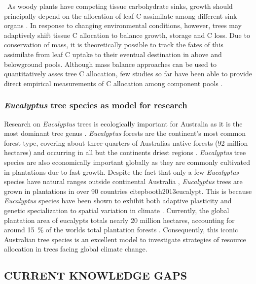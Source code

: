 \documentclass[a4paper]{article}
\begin{document}
\
As woody plants have competing tissue carbohydrate sinks, growth should principally depend on the allocation of leaf C assimilate among different sink organs \citep{kozlowski1992carbohydrate, lacointe2000carbon}. In response to changing environmental conditions, however, trees may adaptively shift tissue C allocation to balance growth, storage and C loss. Due to conservation of mass, it is theoretically possible to track the fates of this assimilate from leaf C uptake to their eventual destination in above and belowground pools. Although mass balance approaches can be used to quantitatively asses tree C allocation, few studies so far have been able to provide direct empirical measurements of C allocation among component pools \citep{klein2015}.

\subsubsection*{\textit{Eucalyptus} tree species as model for research}
Research on \textit{Eucalyptus} trees is ecologically important for Australia as it is the most dominant tree genus \citep{boland2006forest}. \textit{Eucalyptus} forests are the continent’s most common forest type, covering about three-quarters of Australia\textquotesingle s native forests (92 million hectares) and occurring in all but the continent\textquotesingle s driest regions \citep{ASOFR2013}. \textit{Eucalyptus} tree species are also economically important globally as they are commonly cultivated in plantations due to fast growth. Despite the fact that only a few \textit{Eucalyptus} species have natural ranges outside continental Australia \citep{pryor1981eucalyptus}, \textit{Eucalyptus} trees are grown in plantations in over 90 countries citep{booth2013eucalypt}. This is because \textit{Eucalyptus} species have been shown to exhibit both adaptive plasticity and genetic specialization to spatial variation in climate \citep{byrne2013adaptation}. Currently, the global plantation area of eucalypts totals nearly 20 million hectares, accounting for around 15~\% of the world\textquotesingle s total plantation forests \citep{IUFRO2015}. Consequently, this iconic Australian tree species is an excellent model to investigate strategies of resource allocation in trees facing global climate change.

\subsection*{CURRENT KNOWLEDGE GAPS}
\end{document}
